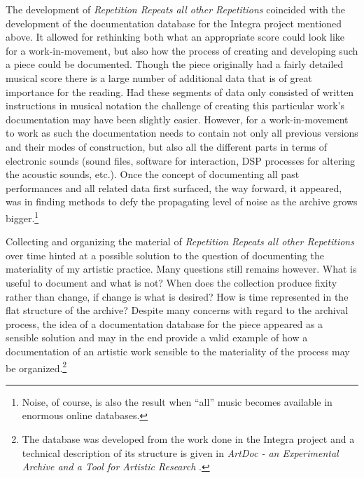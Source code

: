 \documentclass[11pt,a4paper]{article}
\begin{document}
The development of \emph{Repetition Repeats all other Repetitions} coincided with the development of the documentation database for the Integra project mentioned above. It allowed for rethinking both what an appropriate score could look like for a work-in-movement, but also how the process of creating and developing such a piece could be documented. Though the piece originally had a fairly detailed musical score there is a large number of additional data that is of great importance for the reading. Had these segments of data only consisted of written instructions in musical notation the challenge of creating this particular work's documentation may have been slightly easier. However, for a work-in-movement to work as such the documentation needs to contain not only all previous versions and their modes of construction, but also all the different parts in terms of electronic sounds (sound files, software for interaction, DSP processes for altering the acoustic sounds, etc.). Once the concept of documenting all past performances and all related data first surfaced, the way forward, it appeared, was in finding methods to defy the propagating level of noise as the archive grows bigger.\footnote{Noise, of course, is also the result when ``all'' music becomes available in enormous online databases.}

Collecting and organizing the material of \emph{Repetition Repeats all other Repetitions} over time hinted at a possible solution to the question of documenting the materiality of my artistic practice. Many questions still remains however. What is useful to document and what is not? When does the collection produce fixity rather than change, if change is what is desired? How is time represented in the flat structure of the archive?
Despite many concerns with regard to the archival process, the idea of a documentation database for the piece appeared as a sensible solution and may in the end provide a valid example of how a documentation of an artistic work sensible to the materiality of the process may be organized.\footnote{The database was developed from the work done in the Integra project and a technical description of its structure is given in \emph{ArtDoc - an Experimental Archive and a Tool for Artistic Research} \citep{frisk2017}.}

\end{document}
